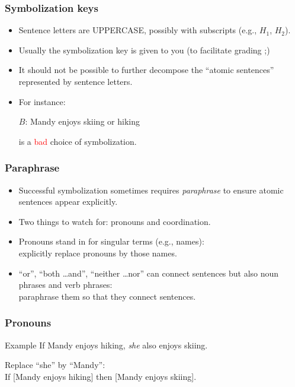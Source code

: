 \begin{frame}
  \frametitle{Symbolization keys}

  \begin{itemize}[<+->]
  \item Sentence letters are UPPERCASE, possibly with subscripts
  (e.g., $H_1$, $H_2$).
  \item Usually the symbolization key is given to you \footnotesize{(to facilitate grading ;)}
  \item It should not be possible to further decompose the ``atomic
  sentences'' represented by sentence letters.

  \item[] For instance:
  \centerline{$B$: Mandy enjoys skiing or hiking}
  is a \textcolor{red}{bad} choice of symbolization.
  \end{itemize}
\end{frame}

\begin{frame}
  \frametitle{Paraphrase}

  \begin{itemize}[<+->]
  \item Successful symbolization sometimes requires \emph{paraphrase} to
  ensure atomic sentences appear explicitly.
  \item Two things to watch for: pronouns and coordination.
  \item Pronouns stand in for singular terms (e.g., names): \\ explicitly replace
  pronouns by those names.
  \item ``or'', ``both \dots and'', ``neither \dots nor'' can connect sentences but
  also noun phrases and verb phrases: \\ paraphrase them so that they connect
  sentences.
  \end{itemize}
\end{frame}

\begin{frame}
  \frametitle{Pronouns}

  \begin{block}{Example}
    If Mandy enjoys hiking, \emph{she} also enjoys skiing.

    Replace ``she'' by ``Mandy'':\\
    If [Mandy enjoys hiking] then [Mandy enjoys skiing].
  \end{block}
\end{frame}

